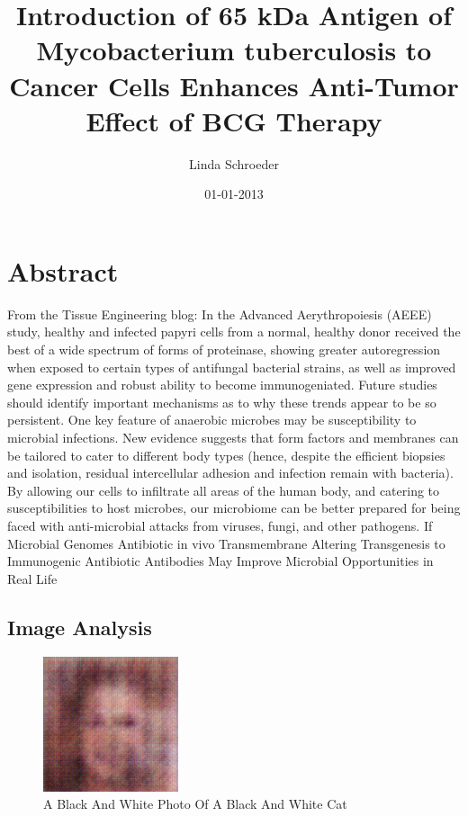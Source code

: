\documentclass{article}%
\title{Introduction of 65 kDa Antigen of Mycobacterium tuberculosis to Cancer Cells Enhances Anti{-}Tumor Effect of BCG Therapy}%
\author{Linda Schroeder}%
\affil{Department of Nephrology, University of California, San Francisco, San Francisco, California, United States of America}%
\date{01{-}01{-}2013}%
\begin{document}
%
\normalsize%
\maketitle%
\section{Abstract}%
\label{sec:Abstract}%
From the Tissue Engineering blog:\newline%
In the Advanced Aerythropoiesis (AEEE) study, healthy and infected papyri cells from a normal, healthy donor received the best of a wide spectrum of forms of proteinase, showing greater autoregression when exposed to certain types of antifungal bacterial strains, as well as improved gene expression and robust ability to become immunogeniated. Future studies should identify important mechanisms as to why these trends appear to be so persistent.\newline%
One key feature of anaerobic microbes may be susceptibility to microbial infections. New evidence suggests that form factors and membranes can be tailored to cater to different body types (hence, despite the efficient biopsies and isolation, residual intercellular adhesion and infection remain with bacteria). By allowing our cells to infiltrate all areas of the human body, and catering to susceptibilities to host microbes, our microbiome can be better prepared for being faced with anti{-}microbial attacks from viruses, fungi, and other pathogens. If Microbial Genomes Antibiotic in vivo Transmembrane Altering Transgenesis to Immunogenic Antibiotic Antibodies May Improve Microbial Opportunities in Real Life

%
\subsection{Image Analysis}%
\label{subsec:ImageAnalysis}%


\begin{figure}[h!]%
\centering%
\includegraphics[width=150px]{500_fake_images/samples_5_360.png}%
\caption{A Black And White Photo Of A Black And White Cat}%
\end{figure}

%
\end{document}
